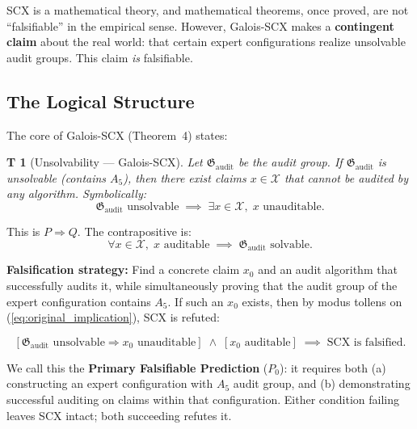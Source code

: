 \documentclass[12pt,a4paper]{article}
\newtheorem{theorem}Theorem[section]
\theoremstyle{remark}
\newcommand{\AuditGrp}{\mathfrak{G}_{\mathrm{audit}}}
\newcommand{\ClaimSpace}{\mathcal{X}}
\begin{document}
SCX is a mathematical theory, and mathematical theorems, once proved, are not ``falsifiable'' in the empirical sense. However, Galois-SCX makes a \textbf{contingent claim} about the real world: that certain expert configurations realize unsolvable audit groups. This claim \textit{is} falsifiable.

\subsection{The Logical Structure}
The core of Galois-SCX (Theorem~4) states:

\begin{theorem}[Unsolvability --- Galois-SCX]\label{thm:galois_unsolvability_original}
Let \(\AuditGrp\) be the audit group. If \(\AuditGrp\) is unsolvable (contains \(A_5\)), then there exist claims \(x \in \ClaimSpace\) that cannot be audited by any algorithm. Symbolically:
\begin{equation}\label{eq:original_implication}
    \AuditGrp \text{ unsolvable} \;\implies\; \exists x \in \ClaimSpace,\; x \text{ unauditable}.
\end{equation}
\end{theorem}

This is \(P \Rightarrow Q\). The contrapositive is:
\begin{equation}\label{eq:contrapositive}
    \forall x \in \ClaimSpace,\; x \text{ auditable} \;\implies\; \AuditGrp \text{ solvable}.
\end{equation}

\textbf{Falsification strategy:} Find a concrete claim \(x_0\) and an audit algorithm that successfully audits it, while simultaneously proving that the audit group of the expert configuration contains \(A_5\). If such an \(x_0\) exists, then by modus tollens on (\ref{eq:original_implication}), SCX is refuted:

\begin{equation}\label{eq:modus_tollens}
    \left[ \AuditGrp \text{ unsolvable} \Rightarrow x_0 \text{ unauditable} \right]
    \;\land\; \left[ x_0 \text{ auditable} \right]
    \;\implies\; \text{SCX is falsified}.
\end{equation}

We call this the \textbf{Primary Falsifiable Prediction} (\(P_0\)): it requires both (a) constructing an expert configuration with \(A_5\) audit group, and (b) demonstrating successful auditing on claims within that configuration. Either condition failing leaves SCX intact; both succeeding refutes it.
\end{document}
